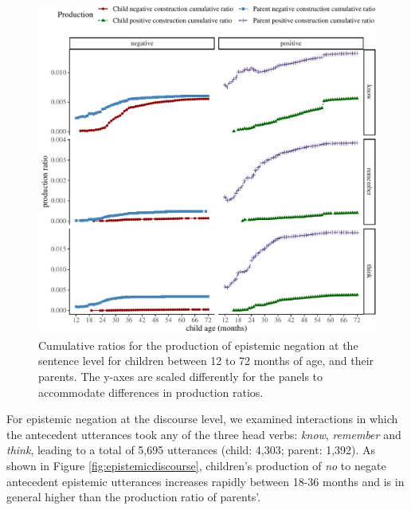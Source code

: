 \documentclass[
  english,
  man,floatsintext]{apa6}
\begin{document}
\begin{figure}[H]

{\centering \includegraphics{neg_construction_article_files/figure-latex/epistemic-1} 

}

\caption{Cumulative ratios for the production of epistemic negation at the sentence level for children between 12 to 72 months of age, and their parents. The y-axes are scaled differently for the panels to accommodate differences in production ratios.}\label{fig:epistemic}
\end{figure}

For epistemic negation at the discourse level, we examined interactions in which the antecedent utterances took any of the three head verbs: \emph{know}, \emph{remember} and \emph{think}, leading to a total of 5,695 utterances (child: 4,303; parent: 1,392). As shown in Figure \ref{fig:epistemicdiscourse}, children's production of \emph{no} to negate antecedent epistemic utterances increases rapidly between 18-36 months and is in general higher than the production ratio of parents'.
\end{document}
